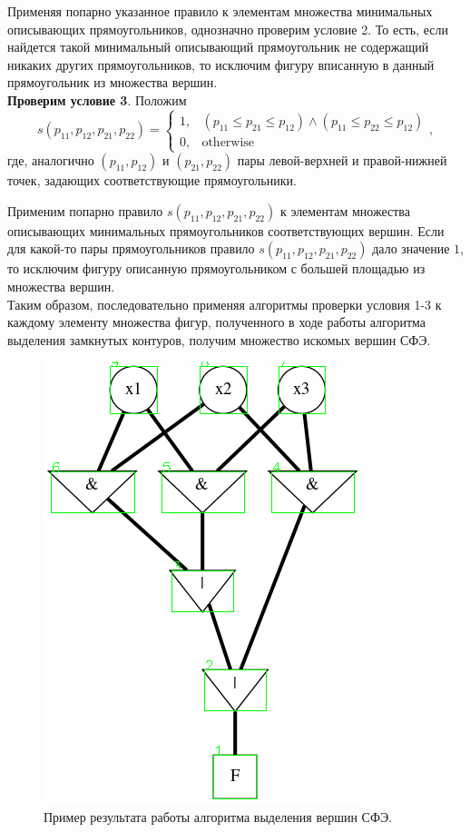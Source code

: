 \documentclass[makeidx, a4paper, 14pt]{extarticle}
\begin{document}
Применяя попарно указанное правило к элементам множества минимальных описывающих прямоугольников, однозначно проверим условие 2.
То есть, если найдется такой минимальный описывающий прямоугольник не содержащий никаких других прямоугольников, то исключим фигуру вписанную в данный прямоугольник
из множества вершин. \\

\textbf{Проверим условие 3}.
Положим \[
    s(p_{11}, p_{12}, p_{21}, p_{22}) = \begin{cases}
        1, &(p_{11} \leq p_{21} \leq p_{12}) \wedge (p_{11} \le p_{22} \le p_{12}) \\
        0, &\textrm{otherwise}
    \end{cases},
\]
где, аналогично ${(p_{11}, p_{12})}$ и $({p_{21}, p_{22}})$ пары левой-верхней и правой-нижней точек, задающих соответствующие прямоугольники.

Применим попарно правило ${s(p_{11}, p_{12}, p_{21}, p_{22})}$ к элементам множества описывающих минимальных прямоугольников соответствующих
вершин. Если для какой-то пары прямоугольников правило ${s(p_{11}, p_{12}, p_{21}, p_{22})}$ дало значение $1$, то исключим фигуру описанную
прямоугольником с большей площадью из множества вершин. \\

Таким образом, последовательно применяя алгоритмы проверки условия 1-3 к каждому элементу множества фигур, полученного в ходе работы алгоритма
выделения замкнутых контуров, получим множество искомых вершин СФЭ.

\begin{figure}[H]
    \centering
    \includegraphics[scale=0.75]{img4_detected_vertices.png}
    \caption{Пример результата работы алгоритма выделения вершин СФЭ.}
\end{figure}
\end{document}

